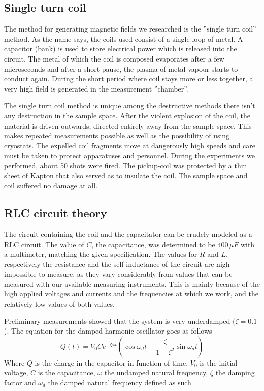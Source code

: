 \subsection{Single turn coil}

The method for generating magnetic fields we researched is the ''single turn 
coil'' method. As the name says, the coils used consist of a single loop of 
metal. A capacitor (bank) is used to store electrical power which is released 
into the circuit. The metal of which the coil is composed evaporates after a 
few microseconds and after a short pause, the plasma of metal vapour starts to 
conduct again. During the short period where coil stays more or less together, 
a very high field is generated in the measurement ''chamber''. 

The single turn coil method is unique among the destructive methods there isn't 
any destruction in the sample space. After the violent explosion of the coil, 
the material is driven outwards, directed entirely away from the sample space.  
This makes repeated measurements possible as well as the possibility of using 
cryostats. The expelled coil fragments move at dangerously high speeds and care 
must be taken to protect apparatuses and personnel. \cite{singleTurn} 
\cite{herlachArticle} During the experiments we performed, about 50 shots were 
fired. The pickup-coil was protected by a thin sheet of Kapton that also served 
as to insulate the coil. The sample space and coil suffered no damage at all.

\subsection{RLC circuit theory}

The circuit containing the coil and the capacitator can be crudely modeled as a 
RLC circuit. The value of $C$, the capacitance, was determined to be $400\,\mu 
F$ with a multimeter, matching the given specification. The values for $R$ and 
$L$, respectively the resistance and the self-inductance of the circuit are 
nigh impossible to measure, as they vary considerably from values that can be 
measured with our available measuring instruments. This is mainly because of 
the high applied voltages and currents and the frequencies at which we work, 
and the relatively low values of both values.

Preliminary measurements showed that the system is very underdamped ($\zeta = 
0.1$). The equation for the damped harmonic oscillator goes as follows 
\cite{serway}
$$
Q(t) = V_0 C e^{-\zeta \omega t} \left( \cos{\omega_d t} + \frac{\zeta} 
{1-\zeta^2} \sin{\omega_d t}\right)
$$
Where $Q$ is the charge in the capacitor in function of time, $V_0$ is the 
initial voltage, $C$ is the capacitance, $\omega$ the undamped natural 
frequency, $\zeta$ the damping factor and $\omega_d$ the damped natural 
frequency defined as such

